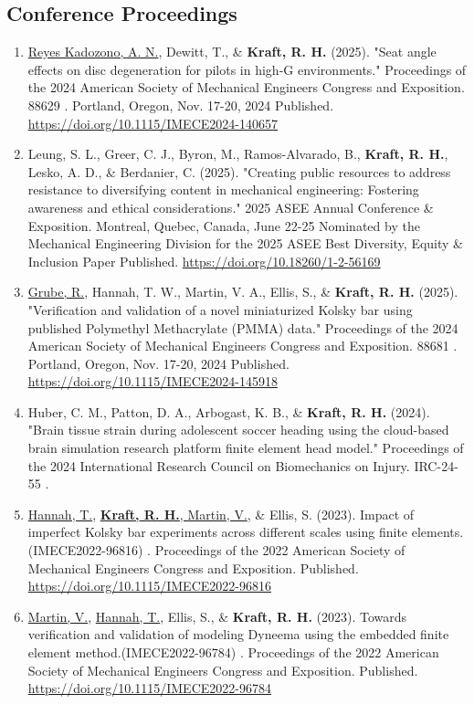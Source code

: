 \documentclass[a4paper,10pt]{article}
\begin{document}
\subsection*{Conference Proceedings}
\begin{enumerate}
\item \underline{Reyes Kadozono, A. N.}, Dewitt, T., \& \textbf{\textbf{Kraft,} R. H.} (2025). "Seat angle effects on disc degeneration for pilots in high-G environments." Proceedings of the 2024 American Society of Mechanical Engineers Congress and Exposition. 88629 .  Portland, Oregon, Nov. 17-20, 2024 Published. \url{https://doi.org/10.1115/IMECE2024-140657}
\item Leung, S. L., Greer, C. J., Byron, M., Ramos-Alvarado, B., \textbf{\textbf{Kraft,} R. H.}, Lesko, A. D., \& Berdanier, C. (2025). "Creating public resources to address resistance to diversifying content in mechanical engineering: Fostering awareness and ethical considerations." 2025 ASEE Annual Conference \& Exposition.  Montreal, Quebec, Canada, June 22-25 Nominated by the Mechanical Engineering Division for the 2025 ASEE Best Diversity, Equity \& Inclusion Paper Published. \url{https://doi.org/10.18260/1-2-56169}
\item \underline{Grube, R.}, Hannah, T. W., Martin, V. A., Ellis, S., \& \textbf{\textbf{Kraft,} R. H.} (2025). "Verification and validation of a novel miniaturized Kolsky bar using published Polymethyl Methacrylate (PMMA) data." Proceedings of the 2024 American Society of Mechanical Engineers Congress and Exposition. 88681 .  Portland, Oregon, Nov. 17-20, 2024 Published. \url{https://doi.org/10.1115/IMECE2024-145918}
\item Huber, C. M., Patton, D. A., Arbogast, K. B., \& \textbf{\textbf{Kraft,} R. H.} (2024). "Brain tissue strain during adolescent soccer heading using the cloud-based brain simulation research platform finite element head model." Proceedings of the 2024 International Research Council on Biomechanics on Injury. IRC-24-55 .
\item \underline{Hannah, T.}, \underline{\textbf{\textbf{Kraft,} R. H.}, Martin, V.}, \& Ellis, S. (2023). Impact of imperfect Kolsky bar experiments across different scales using finite elements.(IMECE2022-96816) . Proceedings of the 2022 American Society of Mechanical Engineers Congress and Exposition. Published. \url{https://doi.org/10.1115/IMECE2022-96816}
\item \underline{Martin, V.}, \underline{Hannah, T.}, Ellis, S., \& \textbf{\textbf{Kraft,} R. H.} (2023). Towards verification and validation of modeling Dyneema using the embedded finite element method.(IMECE2022-96784) . Proceedings of the 2022 American Society of Mechanical Engineers Congress and Exposition. Published. \url{https://doi.org/10.1115/IMECE2022-96784}

\end{enumerate}
\end{document}
